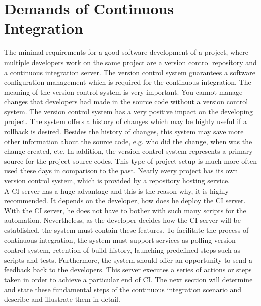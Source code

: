 \section{Demands of Continuous Integration}

The minimal requirements for a good software development of a project, where multiple developers work on the same project are a version control repository and a continuous integration server. The version control system guarantees a software configuration management which is required for the continuous integration. The meaning of the version control system is very important. You cannot manage changes that developers had made in the source code without a version control system. The version control system has a very positive impact on the developing project. The system offers a history of changes which may be highly useful if a rollback is desired. Besides the history of changes, this system may save more other information about the source code, e.g. who did the change, when was the change created, etc. In addition, the version control system represents a primary source for the project source codes. This type of project setup is much more often used these days in comparison to the past. Nearly every project has its own version control system, which is provided by a repository hosting service.\\

A CI server has a huge advantage and this is the reason why, it is highly recommended. It depends on the developer, how does he deploy the CI server. With the CI server, he does not have to bother with such many scripts for the automation. Nevertheless, as the developer decides how the CI server will be established, the system must contain these features. To facilitate the process of continuous integration, the system must support services as polling version control system, retention of build history, launching predefined steps such as scripts and tests. Furthermore, the system should offer an opportunity to send a feedback back to the developers. This server executes a series of actions or steps taken in order to achieve a particular end of CI. The next section will determine and state these fundamental steps of the continuous integration scenario and describe and illustrate them in detail.

